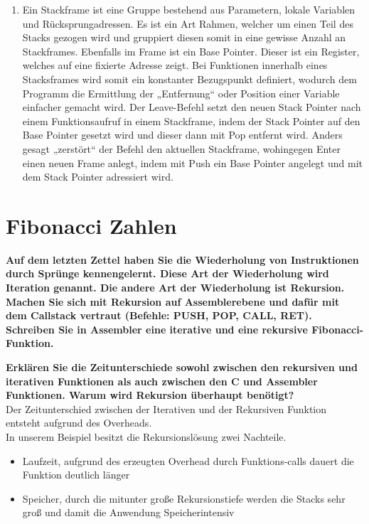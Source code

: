 \documentclass[11pt]{article}
\newcommand{\aufgabe}[1]{\item{\bf #1}}
\begin{document}
\begin{enumerate}
    \item Ein Stackframe ist eine Gruppe bestehend aus Parametern, lokale Variablen und Rücksprungadressen. Es ist ein Art Rahmen, welcher um einen Teil des Stacks gezogen wird und gruppiert diesen somit in eine gewisse Anzahl an Stackframes. Ebenfalls im Frame ist ein Base Pointer. Dieser ist ein Register, welches auf eine fixierte Adresse zeigt. Bei Funktionen innerhalb eines Stacksframes wird somit ein konstanter Bezugspunkt definiert, wodurch dem Programm die Ermittlung der „Entfernung“ oder Position einer Variable einfacher gemacht wird. Der Leave-Befehl setzt den neuen Stack Pointer nach einem Funktionsaufruf in einem Stackframe, indem der Stack Pointer auf den Base Pointer gesetzt wird und dieser dann mit Pop entfernt wird. Anders gesagt „zerstört“ der Befehl den aktuellen Stackframe, wohingegen Enter einen neuen Frame anlegt, indem mit Push ein Base Pointer angelegt und mit dem Stack Pointer adressiert wird.
\end{enumerate}
\newpage
\section{Fibonacci Zahlen}
\aufgabe{Auf dem letzten Zettel haben Sie die Wiederholung von Instruktionen durch Sprünge kennengelernt. Diese Art der Wiederholung wird Iteration genannt. Die andere Art der Wiederholung ist Rekursion. Machen Sie sich mit Rekursion auf Assemblerebene und dafür mit dem Callstack vertraut (Befehle: PUSH, POP, CALL, RET). Schreiben Sie in Assembler eine iterative und eine rekursive Fibonacci-Funktion.}




\newpage
\aufgabe{Erklären Sie die Zeitunterschiede sowohl zwischen den rekursiven und iterativen Funktionen als auch zwischen den C und Assembler Funktionen. Warum wird Rekursion überhaupt benötigt?}
\\
Der Zeitunterschied zwischen der Iterativen und der Rekursiven Funktion entsteht aufgrund des Overheads.
\\
In unserem Beispiel besitzt die Rekursionslösung zwei Nachteile.
\begin{itemize}
    \item Laufzeit, aufgrund des erzeugten Overhead durch Funktions-calls dauert die Funktion deutlich länger
    \item Speicher, durch die mitunter große Rekursionstiefe werden die Stacks sehr groß und damit die Anwendung Speicherintensiv
\end{itemize}
\end{document}
